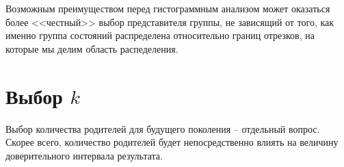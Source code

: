 \documentclass[12pt,twoside,titlepage,сa4paper]{article}
\begin{document}
	\par Возможным преимуществом перед гистограммным анализом может оказаться более <<честный>> выбор представителя группы, не зависящий от того, как именно группа состояний распределена относительно границ отрезков, на которые мы делим область распеделения.
	\section{Выбор $k$}
	\par Выбор количества родителей для будущего поколения -- отдельный вопрос. Скорее всего, количество родителей будет непосредственно влиять на величину доверительного интервала результата.
\nocite{*}
\printbibliography
\end{document}
